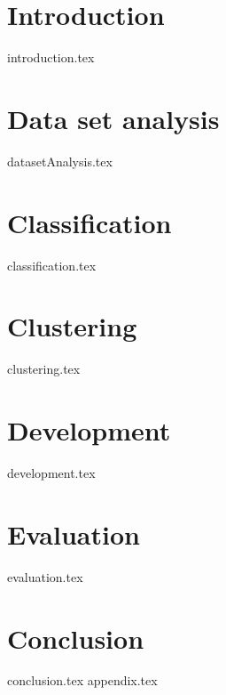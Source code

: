 \documentclass[
    nolot,
    color,   %
	table,   %
    oneside, %
]{fithesis3}
\begin{document}
  \pagestyle{plain}
  
\setlength\emergencystretch{3cm}
  \chapter{Introduction}
  {introduction.tex}
  \chapter{Data set analysis}
  {datasetAnalysis.tex}
  \chapter{Classification}
  {classification.tex}
  \chapter{Clustering}
  {clustering.tex}
  \chapter{Development}
  {development.tex}  
  \chapter{Evaluation}
  {evaluation.tex}  
  \chapter{Conclusion}
  {conclusion.tex}
   {}
  {appendix.tex}
\end{document}
